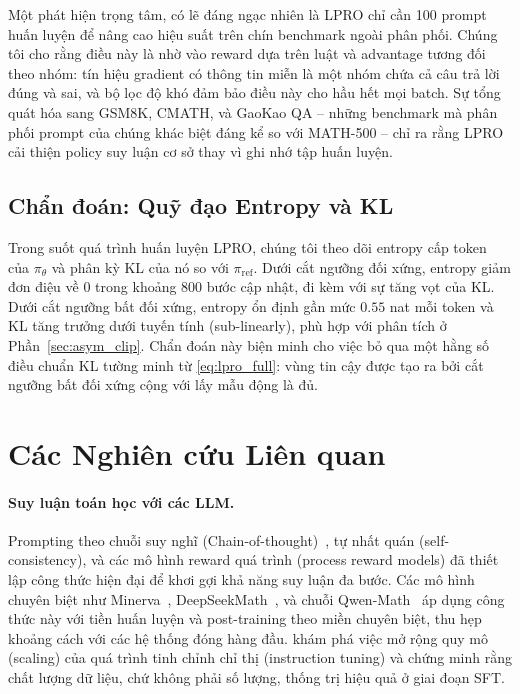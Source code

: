 \documentclass[11pt,a4paper]{article}
\begin{document}
Một phát hiện trọng tâm, có lẽ đáng ngạc nhiên là LPRO chỉ cần 100
prompt huấn luyện để nâng cao hiệu suất trên chín benchmark ngoài phân phối. Chúng tôi cho
rằng điều này là nhờ vào reward dựa trên luật và advantage tương đối theo nhóm: tín hiệu gradient
có thông tin miễn là một nhóm chứa cả câu trả lời đúng và sai, và
bộ lọc độ khó đảm bảo điều này cho hầu hết mọi batch. Sự tổng quát hóa sang GSM8K,
CMATH, và GaoKao QA -- những benchmark mà phân phối prompt của chúng khác biệt đáng kể
so với MATH-500 -- chỉ ra rằng LPRO cải thiện policy suy luận cơ sở
thay vì ghi nhớ tập huấn luyện.

\subsection{Chẩn đoán: Quỹ đạo Entropy và KL}

Trong suốt quá trình huấn luyện LPRO, chúng tôi theo dõi entropy cấp token của \(\pi_\theta\) và
phân kỳ KL của nó so với \(\pi_{\text{ref}}\). Dưới cắt ngưỡng đối xứng, entropy giảm
đơn điệu về 0 trong khoảng 800 bước cập nhật, đi kèm với sự tăng vọt
của KL. Dưới cắt ngưỡng bất đối xứng, entropy ổn định gần mức \(0.55\) nat mỗi
token và KL tăng trưởng dưới tuyến tính (sub-linearly), phù hợp với phân tích ở
Phần~\ref{sec:asym_clip}. Chẩn đoán này biện minh cho việc bỏ qua một hằng số điều chuẩn KL
tường minh từ \eqref{eq:lpro_full}: vùng tin cậy được tạo ra bởi cắt ngưỡng bất đối xứng
cộng với lấy mẫu động là đủ.

\section{Các Nghiên cứu Liên quan}

\paragraph{Suy luận toán học với các LLM.} Prompting theo chuỗi suy nghĩ
(Chain-of-thought)~\citep{wei2022chain}, tự nhất quán (self-consistency), và các mô hình reward quá trình (process reward models) đã thiết lập
công thức hiện đại để khơi gợi khả năng suy luận đa bước. Các mô hình chuyên biệt như
Minerva~\citep{lewkowycz2022solving}, DeepSeekMath~\citep{shao2024deepseekmath}, và
chuỗi Qwen-Math~\citep{yang2024qwen25math} áp dụng công thức này với
tiền huấn luyện và post-training theo miền chuyên biệt, thu hẹp khoảng cách với các
hệ thống đóng hàng đầu. \citet{tang2024mathscale} khám phá việc mở rộng quy mô (scaling) của quá trình tinh chỉnh chỉ thị (instruction tuning) và
chứng minh rằng chất lượng dữ liệu, chứ không phải số lượng, thống trị hiệu quả ở giai đoạn SFT.
\end{document}
